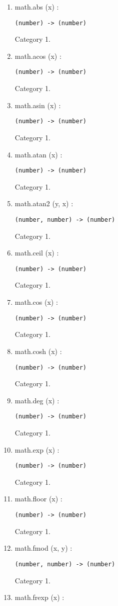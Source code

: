 \documentclass{paper}
\begin{document}
\begin{enumerate}
\item math.abs (x) :
\begin{verbatim}
(number) -> (number)
\end{verbatim}
Category 1.
\item math.acos (x) :
\begin{verbatim}
(number) -> (number)
\end{verbatim}
Category 1.
\item math.asin (x) :
\begin{verbatim}
(number) -> (number)
\end{verbatim}
Category 1.
\item math.atan (x) :
\begin{verbatim}
(number) -> (number)
\end{verbatim}
Category 1.
\item math.atan2 (y, x) :
\begin{verbatim}
(number, number) -> (number)
\end{verbatim}
Category 1.
\item math.ceil (x) :
\begin{verbatim}
(number) -> (number)
\end{verbatim}
Category 1.
\item math.cos (x) :
\begin{verbatim}
(number) -> (number)
\end{verbatim}
Category 1.
\item math.cosh (x) :
\begin{verbatim}
(number) -> (number)
\end{verbatim}
Category 1.
\item math.deg (x) :
\begin{verbatim}
(number) -> (number)
\end{verbatim}
Category 1.
\item math.exp (x) :
\begin{verbatim}
(number) -> (number)
\end{verbatim}
Category 1.
\item math.floor (x) :
\begin{verbatim}
(number) -> (number)
\end{verbatim}
Category 1.
\item math.fmod (x, y) :
\begin{verbatim}
(number, number) -> (number)
\end{verbatim}
Category 1.
\item math.frexp (x) :

\end{enumerate}
\end{document}
